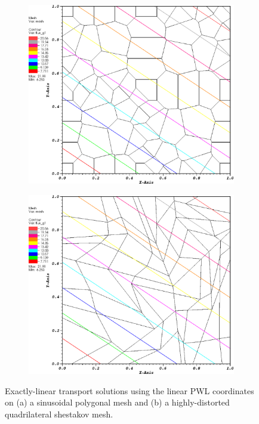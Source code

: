 \documentclass[11pt]{article}
\begin{document}
\vspace{2mm}
\begin{figure}[hbt]
\centering
	\begin{subfigure}[b]{0.42\textwidth}
		\centering
		\includegraphics[width=\textwidth]{figures/smooth_poly_PWLD_k1.eps}
		\caption{}
	\end{subfigure}
	\hfill
	\begin{subfigure}[b]{0.42\textwidth}
		\centering
		\includegraphics[width=\textwidth]{figures/shes_quad_PWLD_k1.eps}
		\caption{}
	\end{subfigure}
\caption{Exactly-linear transport solutions using the linear PWL coordinates on (a) a sinusoidal polygonal mesh and (b) a highly-distorted quadrilateral shestakov mesh.}
\label{fig::lin_sol}
\end{figure}
\vspace{2mm}
\end{document}
